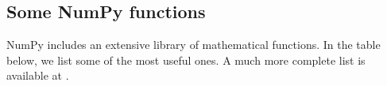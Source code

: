 \documentclass[letterpaper,10pt,english]{sphinxmanual}
\begin{document}
\ignorespaces 

\subsection{Some NumPy functions}
\label{\detokenize{chap2/chap2_basics:some-numpy-functions}}\label{\detokenize{chap2/chap2_basics:index-11}}
\ignorespaces 
\sphinxAtStartPar
NumPy includes an extensive library of mathematical functions.  In the table below, we list some of the most useful ones.  A much more complete list is available at .
\end{document}
